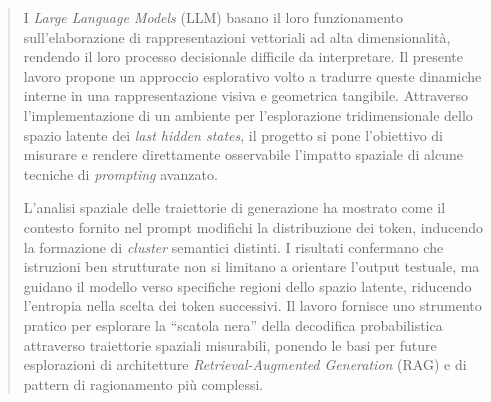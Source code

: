 \begin{abstract}
I \textit{Large Language Models} (LLM) basano il loro funzionamento sull'elaborazione di rappresentazioni vettoriali ad alta dimensionalità, rendendo il loro processo decisionale difficile da interpretare. Il presente lavoro propone un approccio esplorativo volto a tradurre queste dinamiche interne in una rappresentazione visiva e geometrica tangibile. Attraverso l'implementazione di un ambiente per l'esplorazione tridimensionale dello spazio latente dei \textit{last hidden states}, il progetto si pone l'obiettivo di misurare e rendere direttamente osservabile l'impatto spaziale di alcune tecniche di \textit{prompting} avanzato.

L'analisi spaziale delle traiettorie di generazione ha mostrato come il contesto fornito nel prompt modifichi la distribuzione dei token, inducendo la formazione di \textit{cluster} semantici distinti. I risultati confermano che istruzioni ben strutturate non si limitano a orientare l'output testuale, ma guidano il modello verso specifiche regioni dello spazio latente, riducendo l'entropia nella scelta dei token successivi. Il lavoro fornisce uno strumento pratico per esplorare la ``scatola nera'' della decodifica probabilistica attraverso traiettorie spaziali misurabili, ponendo le basi per future esplorazioni di architetture \textit{Retrieval-Augmented Generation} (RAG) e di pattern di ragionamento più complessi.
\end{abstract}